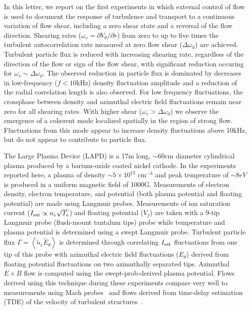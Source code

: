 \documentclass[aps,prl,amsmath,amssymb,preprint,superscriptaddress]{revtex4}
\begin{document}
In this letter, we report on the first experiments in which external
control of flow is used to document the response of turbulence and
transport to a continuous variation of flow shear, including a zero
shear state and a reversal of the flow direction.  
Shearing rates ($\omega_{s}= \partial V_{\theta}/\partial r$) from
zero to up to five times the turbulent autocorrelation rate measured
at zero flow shear ($\Delta \omega_{d}$) are achieved. Turbulent
particle flux is reduced with increasing shearing rate, regardless of the
direction of the flow or sign of the flow shear, with significant
reduction occuring for $\omega_s \sim \Delta \omega_d$.  The observed
reduction in particle flux is dominated by decreases in low-frequency
($f < 10$kHz) density fluctuation amplitude and a reduction of the
radial correlation length is also observed. For low frequency
fluctuations, the crossphase
between density and azimuthal electric field fluctuations remain near
zero for all shearing rates.  With higher shear ($\omega_s > \Delta
\omega_d$) we observe the emergence of a coherent mode localized spatially in the region
of strong flow. Fluctuations from this mode appear to increase density
fluctuations above 10kHz, but do not appear to contribute to particle
flux.   

The Large Plasma Device \cite{gek91} (LAPD) is a 17m long, $\sim 60$cm
diameter cylindrical plasma produced by a barium-oxide coated nickel
cathode. In the experiments reported here, a plasma of density $\sim 5
\times 10^{12}$ cm$^{-3}$ and peak temperature of $\sim 8 eV$ is
produced in a uniform magnetic field of 1000G.  Measurements of 
electron density, electron temperature, and potential (both plasma
potential and floating potential) are made using Langmuir probes.  
Measurements of ion saturation current ($I_{\rm sat} \propto n_e \sqrt{T_e}$) and floating
potential ($V_f$) are taken with a 9-tip Langmuir probe (flush-mount
tantalum tips) probe while temperature and plasma potential is
determined using a swept Langmuir probe. Turbulent particle flux
$\Gamma = \left<\tilde{n}_e \tilde{E}_\theta\right>$ is
determined through correlating $I_{\rm sat}$ fluctuations from one tip
of this probe with
azimuthal electric field fluctuations ($E_\theta$) derived from
floating potential fluctuations on two azimuthally separated tips.
Azimuthal $E\times B$ flow is computed
using the swept-prob-derived plasma potential.  Flows derived using
this technique during these experiments compare very well to measurements using
Mach probes~\cite{maggs2007} and flows derived from time-delay
estimation (TDE) of the velocity of turbulent structures~\cite{}.
 
\end{document}
